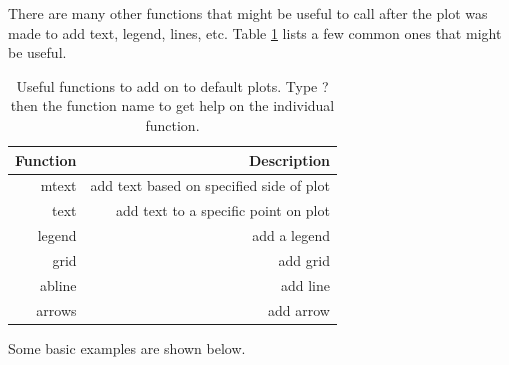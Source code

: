 \documentclass[a4paper,11pt]{article}\usepackage[]{graphicx}\usepackage[]{color}
\begin{document}
There are many other functions that might be useful to call after the plot was made to add text, legend, lines, etc. Table \ref{table:addOns} lists a few common ones that might be useful.

\begin{table}[ht]
\centering
\begin{tabular}{rr}
  \hline
Function & Description  \\ 
  \hline
mtext & add text based on specified side of plot\\
text & add text to a specific point on plot\\
legend & add a legend \\ 
grid & add grid\\ 
abline & add line \\
arrows & add arrow \\ 
   \hline
\end{tabular}
\caption{Useful functions to add on to default plots. Type ? then the function name to get help on the individual function.} 
\label{table:addOns}
\end{table}

Some basic examples are shown below.
\end{document}
